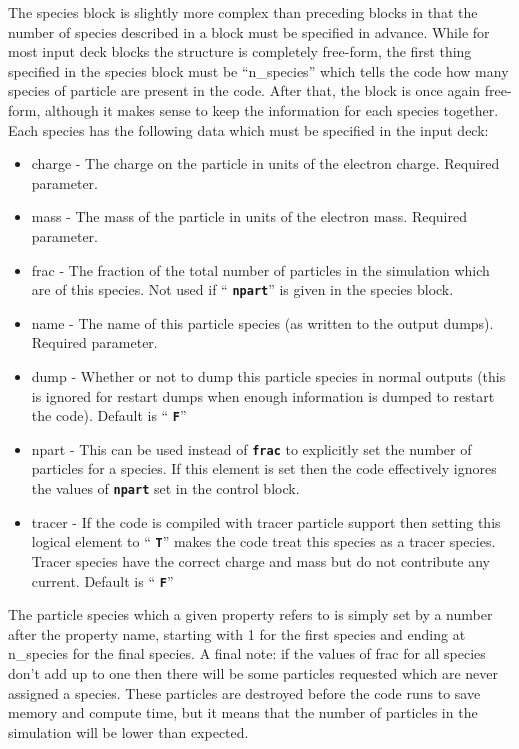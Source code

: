 \documentclass[12pt,a4paper]{article}
\newcommand{\inlinecode}[1]{{\color{warwickred} \bf\texttt{#1}}}
\begin{document}
The species block is slightly more complex than preceding blocks in that the
number of species described in a block must be specified in advance. While
for most input deck blocks the structure is completely free-form, the first
thing specified in the species block must be ``n\_species'' which tells the
code how many species of particle are present in the code. After that, the
block is once again free-form, although it makes sense to keep the information
for each species together. Each species has the following data which must be
specified in the input deck:\\
\begin{itemize}
\item charge - The charge on the particle in units of the electron charge.
  Required parameter.
\item mass - The mass of the particle in units of the electron mass.
  Required parameter.
\item frac - The fraction of the total number of particles in the simulation
  which are of this species. Not used if ``\inlinecode{npart}'' is given in
  the species block.
\item name - The name of this particle species (as written to the output
  dumps). Required parameter.
\item dump - Whether or not to dump this particle species in normal outputs
  (this is ignored for restart dumps when enough information is dumped to
  restart the code). Default is ``\inlinecode{F}''
\item npart - This can be used instead of \inlinecode{frac} to explicitly set
  the number of particles for a species. If this element is set then the code
  effectively ignores the values of \inlinecode{npart} set in the control
  block.
\item tracer - If the code is compiled with tracer particle support then
  setting this logical element to ``\inlinecode{T}'' makes the code treat this
  species as a tracer species. Tracer species have the correct charge and mass
  but do not contribute any current. Default is ``\inlinecode{F}''
\end{itemize}

The particle species which a given property refers to is simply set by a
number after the property name, starting with 1 for the first species and
ending at n\_species for the final species. A final note: if the values of
frac for all species don't add up to one then there will be some particles
requested which are never assigned a species. These particles are destroyed
before the code runs to save memory and compute time, but it means that the
number of particles in the simulation will be lower than expected.\\
\end{document}
